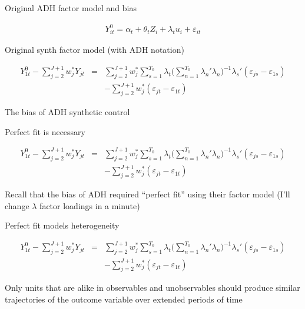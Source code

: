 \documentclass{beamer}
\begin{document}
\begin{frame}{Original ADH factor model and bias}

\begin{eqnarray*}
Y_{it}^0 = \alpha_t + \theta_t Z_i + \lambda_t u_i + \varepsilon_{it}
\end{eqnarray*}

\bigskip

Original synth factor model (with ADH notation)

\bigskip

\begin{eqnarray*}
Y^0_{1t} - \sum^{J+1}_{j=2}w^*_jY_{jt} &=& \sum_{j=2}^{J+1} w_j^* \sum_{s=1}^{T_0} \lambda_t \bigg ( \sum_{n=1}^{T_0} \lambda_n'\lambda_n \bigg )
^{-1} \lambda_s'(\varepsilon_{js} - \varepsilon_{1s} ) \\
&& - \sum_{j=2}^{J+1} w_j^* (\varepsilon_{jt} - \varepsilon_{1t})
\end{eqnarray*}

\bigskip

The bias of ADH synthetic control


\end{frame}




\begin{frame}{Perfect fit is necessary}

\begin{eqnarray*}
Y^0_{1t} - \sum^{J+1}_{j=2}w^*_jY_{jt} &=& \sum_{j=2}^{J+1} w_j^* \sum_{s=1}^{T_0} \lambda_t \bigg ( \sum_{n=1}^{T_0} \lambda_n'\lambda_n \bigg )
^{-1} \lambda_s'(\varepsilon_{js} - \varepsilon_{1s} ) \\
&& - \sum_{j=2}^{J+1} w_j^* (\varepsilon_{jt} - \varepsilon_{1t})
\end{eqnarray*}

\bigskip

Recall that the bias of ADH required ``perfect fit'' using their factor model (I'll change $\lambda$ factor loadings in a minute)

\end{frame}




\begin{frame}{Perfect fit models heterogeneity}


\begin{eqnarray*}
Y^0_{1t} - \sum^{J+1}_{j=2}w^*_jY_{jt} &=& \sum_{j=2}^{J+1} w_j^* \sum_{s=1}^{T_0} \lambda_t \bigg ( \sum_{n=1}^{T_0} \lambda_n'\lambda_n \bigg )
^{-1} \lambda_s'(\varepsilon_{js} - \varepsilon_{1s} ) \\
&& - \sum_{j=2}^{J+1} w_j^* (\varepsilon_{jt} - \varepsilon_{1t})
\end{eqnarray*}

Only units that are alike in observables and unobservables should produce similar trajectories of the outcome variable over extended periods of time


\end{frame}
\end{document}
